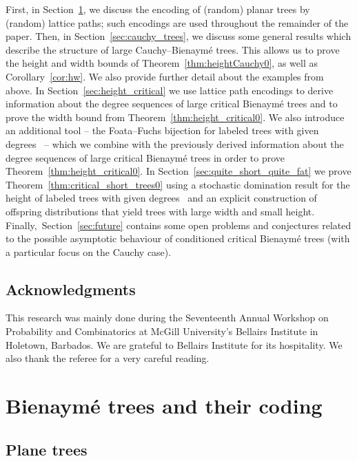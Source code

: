 \documentclass[AHL,Unicode,longabstracts,published]{cedram}
\begin{document}
First, in Section~\ref{sec:trees}, we discuss the encoding of (random) planar trees by (random) lattice paths; such encodings are used throughout the remainder of the paper. Then, in Section~\ref{sec:cauchy_trees}, we discuss some general results which describe the structure of large Cauchy--Bienaymé trees. This allows us to prove the height and width bounds of Theorem~\ref{thm:heightCauchy0}, as well as Corollary~\ref{cor:hw}. We also provide further detail about the examples from above. In Section~\ref{sec:height_critical} we use lattice path encodings to derive information about the degree sequences of large critical Bienaymé trees and to prove the width bound from Theorem~\ref{thm:height_critical0}. We also introduce an additional tool -- the Foata--Fuchs bijection for labeled trees with given degrees~\cite{cayley_us,FoataFuchs} -- which we combine with the previously derived information about the degree sequences of large critical Bienaymé trees in order to prove Theorem~\ref{thm:height_critical0}. {In Section~\ref{sec:quite_short_quite_fat} we prove Theorem~\ref{thm:critical_short_trees0} using a stochastic domination result for the height of labeled trees with given degrees~\cite{AD22} and an explicit construction of offspring distributions that yield trees with large width and small height.} Finally,~Section~\ref{sec:future} contains some open problems and conjectures related to the possible asymptotic behaviour of conditioned critical Bienaymé trees (with a particular focus on the Cauchy case).

\subsection*{Acknowledgments}

This research was mainly done during the Seventeenth Annual Workshop on Probability and Combinatorics at McGill University’s Bellairs Institute in Holetown, Barbados. We are grateful to Bellairs Institute for its hospitality. We also thank the referee for a very careful reading.


\section{Bienaymé trees and their coding}\label{sec:trees}

\subsection{Plane trees}\label{sssec:planetrees}
\end{document}
